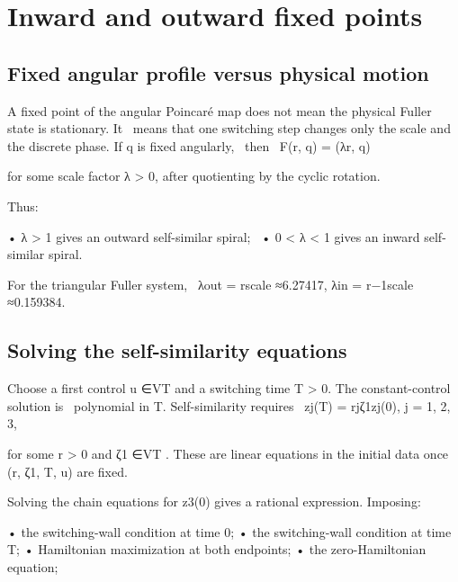 \chapter{Inward and outward fixed points}
\section{Fixed angular profile versus physical motion}

\begin{displaytext}
A fixed point of the angular Poincaré map does not mean the physical Fuller state is stationary. It \
means that one switching step changes only the scale and the discrete phase. If q is fixed angularly, \
then \
F(r, q) = (λr, q)
\end{displaytext}

for some scale factor λ > 0, after quotienting by the cyclic rotation.


Thus:


\begin{displaytext}
• λ > 1 gives an outward self-similar spiral; \
• 0 < λ < 1 gives an inward self-similar spiral.
\end{displaytext}

\begin{displaytext}
For the triangular Fuller system, \
λout = rscale ≈6.27417, λin = r−1scale ≈0.159384.
\end{displaytext}

\section{Solving the self-similarity equations}

\begin{displaytext}
Choose a first control u ∈VT and a switching time T > 0. The constant-control solution is \
polynomial in T. Self-similarity requires \
zj(T) = rjζ1zj(0), j = 1, 2, 3,
\end{displaytext}

\begin{displaytext}
for some r > 0 and ζ1 ∈VT . These are linear equations in the initial data once (r, ζ1, T, u) are fixed.
\end{displaytext}

Solving the chain equations for z3(0) gives a rational expression. Imposing:


• the switching-wall condition at time 0; • the switching-wall condition at time T; • Hamiltonian maximization at both endpoints; • the zero-Hamiltonian equation;


